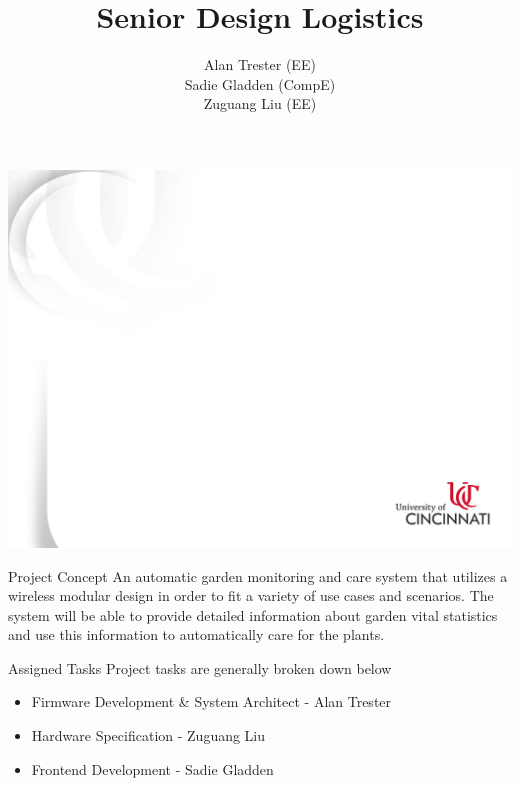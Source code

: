 \documentclass{beamer}
\title{Senior Design Logistics}
\author[Alan Trester, Sadie Gladden, Zugaung Liu]{Alan Trester (EE) \\ Sadie Gladden (CompE) \\ Zuguang Liu (EE)}
\begin{document}
	
{\includegraphics[width=\paperwidth,height=\paperheight,keepaspectratio]{title_background.jpg}}
	

\begin{frame}[plain]
    \maketitle
\end{frame}


\begin{frame}{Project Concept}
	An automatic garden monitoring and care system that utilizes a wireless modular design in order to fit a variety of use cases and scenarios. The system will be able to provide detailed information about garden vital statistics and use this information to automatically care for the plants.
\end{frame}

\begin{frame}{Assigned Tasks}
  Project tasks are generally broken down below
  \begin{itemize}
    \item Firmware Development \& System Architect - Alan Trester
    \item Hardware Specification - Zuguang Liu
    \item Frontend Development - Sadie Gladden
  \end{itemize}
\end{frame}
\end{document}
